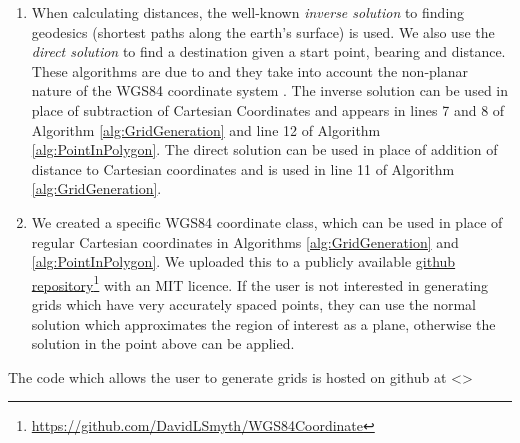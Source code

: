 \begin{enumerate}
    \item When calculating distances, the well-known \textit{inverse solution} to finding geodesics (shortest paths along the earth's surface) is used. We also use the \textit{direct solution} to find a destination given a start point, bearing and distance. These algorithms are due to \citeauthor{Vincenty1975DirectEquations} and they take into account the non-planar nature of the WGS84 coordinate system \cite{Vincenty1975DirectEquations}. The inverse solution can be used in place of subtraction of Cartesian Coordinates and appears in lines 7 and 8 of Algorithm \ref{alg:GridGeneration} and line 12 of Algorithm \ref{alg:PointInPolygon}. The direct solution can be used in place of addition of distance to Cartesian coordinates and is used in line 11 of Algorithm \ref{alg:GridGeneration}.
    
    \item We created a specific WGS84 coordinate class, which can be used in place of regular Cartesian coordinates in Algorithms \ref{alg:GridGeneration} and \ref{alg:PointInPolygon}. We uploaded this to a publicly available  \href{https://github.com/DavidLSmyth/WGS84Coordinate}{github repository}\footnote{\href {https://github.com/DavidLSmyth/WGS84Coordinate}{https://github.com/DavidLSmyth/WGS84Coordinate}} with an MIT licence. If the user is not interested in generating grids which have very accurately spaced points, they can use the normal solution which approximates the region of interest as a plane, otherwise the solution in the point above can be applied.
\end{enumerate}

The code which allows the user to generate grids is hosted on github at <> 

